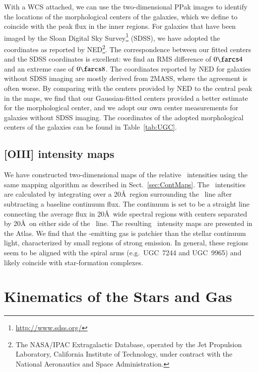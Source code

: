 \documentclass[traditabstract]{aa} %
\begin{document}
With a WCS attached, we can use the two-dimensional PPak images to identify the
locations of the morphological centers of the galaxies, which we define to
coincide with the peak flux in the inner regions.  For galaxies that have been
imaged by the Sloan Digital Sky Survey\footnote{
%
\url{http://www.sdss.org/}
%
} (SDSS), we have adopted the coordinates as reported by NED\footnote{
%
The NASA/IPAC Extragalactic Database, operated by the Jet Propulsion Laboratory,
California Institute of Technology, under contract with the National Aeronautics
and Space Administration.
%
}.  The correspondence between our fitted centers and the SDSS coordinates is
excellent: we find an RMS difference of $0\farcs4$ and an extreme case of
$0\farcs8$.  The coordinates reported by NED for galaxies without SDSS imaging
are mostly derived from 2MASS, where the agreement is often worse.  By comparing
with the centers provided by NED to the central peak in the maps, we find that
our Gaussian-fitted centers provided a better estimate for the morphological 
center, and we adopt our own center measurements for galaxies without SDSS imaging.
The coordinates of the adopted morphological centers of the galaxies can be found in
Table~\ref{tab:UGC}.


\subsection{[OIII] intensity maps}
\label{sec:OIIIint}

We have constructed two-dimensional maps of the relative \oiii\ intensities
using the same mapping algorithm as described in Sect.~\ref{sec:ContMaps}.
The \oiii\ intensities are calculated by integrating over a 20\AA\ region
surrounding the \oiii\ line after subtracting a baseline continuum flux.  The
continuum is set to be a straight line connecting the average flux in 20\AA\
wide spectral regions with centers separated by 20\AA\ on either side of the
\oiii\ line.  The resulting \oiii\ intensity maps are presented in the Atlas.
We find that the \oiii-emitting gas is patchier than the stellar continuum
light, characterized by small regions of strong emission.  In general, these
regions seem to be aligned with the spiral arms (e.g.\ UGC~7244 and UGC~9965)
and likely coincide with star-formation complexes.


\section{Kinematics of the Stars and Gas}
\label{sec:Analysis}
\end{document}
